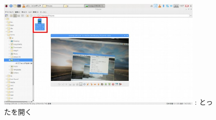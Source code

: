 \documentclass[a4paper,12pt]{jarticle}
\begin{document}
\begin{figure}
  \centering
  \begin{minipage}{10cm}
    {\upshape
      \includegraphics[width=10cm]{textbook-img122.jpg}
      \newline
      {\theFigure\label{seq:refFigure28}}:
      とったを開く}
  \end{minipage}
\end{figure}

\bigskip

\clearpage
\end{document}
